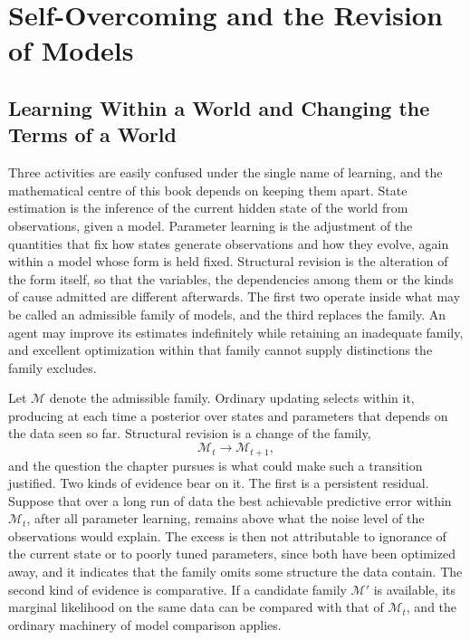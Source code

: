 \part{Self-Overcoming and the Revision of Models}

\chapter{Learning Within a World and Changing the Terms of a World}

Three activities are easily confused under the single name of learning, and the mathematical centre of this book depends on keeping them apart. State estimation is the inference of the current hidden state of the world from observations, given a model. Parameter learning is the adjustment of the quantities that fix how states generate observations and how they evolve, again within a model whose form is held fixed. Structural revision is the alteration of the form itself, so that the variables, the dependencies among them or the kinds of cause admitted are different afterwards. The first two operate inside what may be called an admissible family of models, and the third replaces the family. An agent may improve its estimates indefinitely while retaining an inadequate family, and excellent optimization within that family cannot supply distinctions the family excludes.

Let $\mathcal{M}$ denote the admissible family. Ordinary updating selects within it, producing at each time a posterior over states and parameters that depends on the data seen so far. Structural revision is a change of the family,
\[
\mathcal{M}_{t}\longrightarrow\mathcal{M}_{t+1},
\]
and the question the chapter pursues is what could make such a transition justified. Two kinds of evidence bear on it. The first is a persistent residual. Suppose that over a long run of data the best achievable predictive error within $\mathcal{M}_t$, after all parameter learning, remains above what the noise level of the observations would explain. The excess is then not attributable to ignorance of the current state or to poorly tuned parameters, since both have been optimized away, and it indicates that the family omits some structure the data contain. The second kind of evidence is comparative. If a candidate family $\mathcal{M}'$ is available, its marginal likelihood on the same data can be compared with that of $\mathcal{M}_t$, and the ordinary machinery of model comparison applies.

